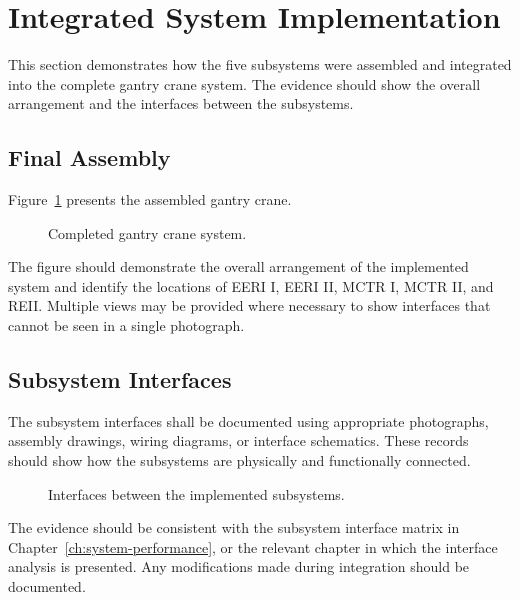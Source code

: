 \section{Integrated System Implementation}
\label{sec:integrated-system-evidence}

This section demonstrates how the five subsystems were assembled
and integrated into the complete gantry crane system. The evidence
should show the overall arrangement and the interfaces between
the subsystems.

\subsection{Final Assembly}

Figure~\ref{fig:integrated-system-evidence} presents the assembled
gantry crane.

\begin{figure}[H]
    \centering
    \caption{Completed gantry crane system.}
    \label{fig:integrated-system-evidence}
\end{figure}

The figure should demonstrate the overall arrangement of the
implemented system and identify the locations of EERI I, EERI II,
MCTR I, MCTR II, and REII. Multiple views may be provided where
necessary to show interfaces that cannot be seen in a single
photograph.

\subsection{Subsystem Interfaces}

The subsystem interfaces shall be documented using appropriate
photographs, assembly drawings, wiring diagrams, or interface
schematics. These records should show how the subsystems are
physically and functionally connected.

\begin{figure}[H]
    \centering
    \caption{Interfaces between the implemented subsystems.}
    \label{fig:system-interfaces}
\end{figure}

The evidence should be consistent with the subsystem interface
matrix in Chapter~\ref{ch:system-performance}, or the relevant
chapter in which the interface analysis is presented. Any
modifications made during integration should be documented.

